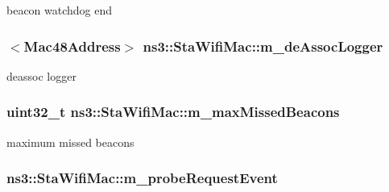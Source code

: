 beacon watchdog end 

\subsubsection[{\texorpdfstring{m\+\_\+de\+Assoc\+Logger}{m_deAssocLogger}}]{$<${\bf Mac48\+Address}$>$ ns3\+::\+Sta\+Wifi\+Mac\+::m\+\_\+de\+Assoc\+Logger\hspace{0.3cm}{\ttfamily [private]}}\hypertarget{classns3_1_1StaWifiMac_a1efb70af228ede5022ab5d054441a040}{}\label{classns3_1_1StaWifiMac_a1efb70af228ede5022ab5d054441a040}


deassoc logger 

\subsubsection[{\texorpdfstring{m\+\_\+max\+Missed\+Beacons}{m_maxMissedBeacons}}]{\setlength{\rightskip}{0pt plus 5cm}uint32\+\_\+t ns3\+::\+Sta\+Wifi\+Mac\+::m\+\_\+max\+Missed\+Beacons\hspace{0.3cm}{\ttfamily [private]}}\hypertarget{classns3_1_1StaWifiMac_a725655d9a8bb335d6156a0c0a5b0753f}{}\label{classns3_1_1StaWifiMac_a725655d9a8bb335d6156a0c0a5b0753f}


maximum missed beacons 

\subsubsection[{\texorpdfstring{m\+\_\+probe\+Request\+Event}{m_probeRequestEvent}}]{ ns3\+::\+Sta\+Wifi\+Mac\+::m\+\_\+probe\+Request\+Event\hspace{0.3cm}{\ttfamily [private]}}\hypertarget{classns3_1_1StaWifiMac_a9794c3204b184f30fe9b920ac099c7c7}{}\label{classns3_1_1StaWifiMac_a9794c3204b184f30fe9b920ac099c7c7}



